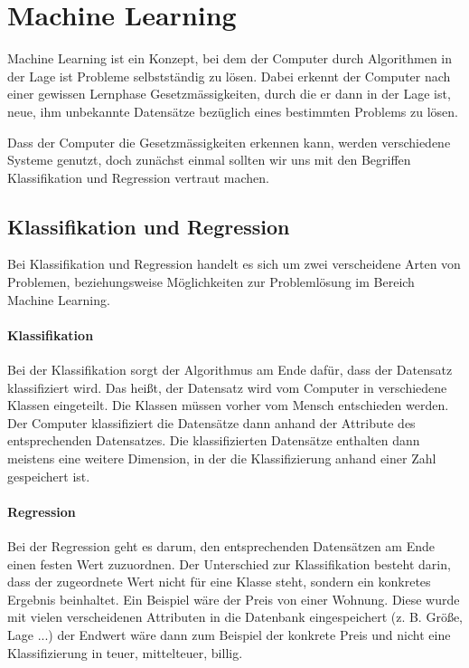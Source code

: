 \section{Machine Learning}
Machine Learning ist ein Konzept, bei dem der Computer durch Algorithmen in der Lage ist Probleme selbstständig zu lösen. Dabei erkennt der Computer nach einer gewissen Lernphase Gesetzmässigkeiten, durch die er dann in der Lage ist, neue, ihm unbekannte Datensätze bezüglich eines bestimmten Problems zu lösen.

Dass der Computer die Gesetzmässigkeiten erkennen kann, werden verschiedene Systeme genutzt, doch zunächst einmal sollten wir uns mit den Begriffen Klassifikation und Regression vertraut machen.


\subsection{Klassifikation und Regression}
\author{David Steinmann}
Bei Klassifikation und Regression handelt es sich um zwei verscheidene Arten von Problemen, beziehungsweise Möglichkeiten zur Problemlösung im Bereich Machine Learning.

\paragraph{Klassifikation}
Bei der Klassifikation sorgt der Algorithmus am Ende dafür, dass der Datensatz klassifiziert wird. Das heißt, der Datensatz wird vom Computer in verschiedene Klassen eingeteilt. Die Klassen müssen vorher vom Mensch entschieden werden. Der Computer klassifiziert die Datensätze dann anhand der Attribute des entsprechenden Datensatzes. Die klassifizierten Datensätze enthalten dann meistens eine weitere Dimension, in der die Klassifizierung anhand einer Zahl gespeichert ist.

\paragraph{Regression}
Bei der Regression geht es darum, den entsprechenden Datensätzen am Ende einen festen Wert zuzuordnen. Der Unterschied zur Klassifikation besteht darin, dass der zugeordnete Wert nicht für eine Klasse steht, sondern ein konkretes Ergebnis beinhaltet. Ein Beispiel wäre der Preis von einer Wohnung. Diese wurde mit vielen verscheidenen Attributen in die Datenbank eingespeichert (z. B. Größe, Lage ...) der Endwert wäre dann zum Beispiel der konkrete Preis und nicht eine Klassifizierung in \glqq teuer\grqq , \glqq mittelteuer\grqq , \glqq billig\grqq . 

